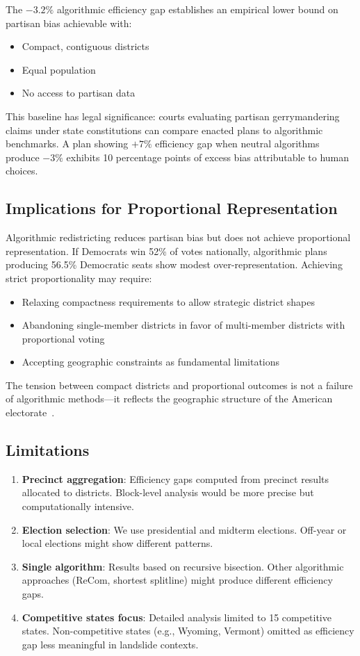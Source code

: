 The $-3.2\%$ algorithmic efficiency gap establishes an empirical lower bound on partisan bias achievable with:
\begin{itemize}
\item Compact, contiguous districts
\item Equal population
\item No access to partisan data
\end{itemize}

This baseline has legal significance: courts evaluating partisan gerrymandering claims under state constitutions can compare enacted plans to algorithmic benchmarks. A plan showing $+7\%$ efficiency gap when neutral algorithms produce $-3\%$ exhibits 10 percentage points of excess bias attributable to human choices.

\subsection{Implications for Proportional Representation}

Algorithmic redistricting reduces partisan bias but does not achieve proportional representation. If Democrats win 52\% of votes nationally, algorithmic plans producing 56.5\% Democratic seats show modest over-representation. Achieving strict proportionality may require:
\begin{itemize}
\item Relaxing compactness requirements to allow strategic district shapes
\item Abandoning single-member districts in favor of multi-member districts with proportional voting
\item Accepting geographic constraints as fundamental limitations
\end{itemize}

The tension between compact districts and proportional outcomes is not a failure of algorithmic methods—it reflects the geographic structure of the American electorate~\cite{chen2013unintentional}.

\subsection{Limitations}

\begin{enumerate}
\item \textbf{Precinct aggregation}: Efficiency gaps computed from precinct results allocated to districts. Block-level analysis would be more precise but computationally intensive.
\item \textbf{Election selection}: We use presidential and midterm elections. Off-year or local elections might show different patterns.
\item \textbf{Single algorithm}: Results based on recursive bisection. Other algorithmic approaches (ReCom, shortest splitline) might produce different efficiency gaps.
\item \textbf{Competitive states focus}: Detailed analysis limited to 15 competitive states. Non-competitive states (e.g., Wyoming, Vermont) omitted as efficiency gap less meaningful in landslide contexts.
\end{enumerate}
